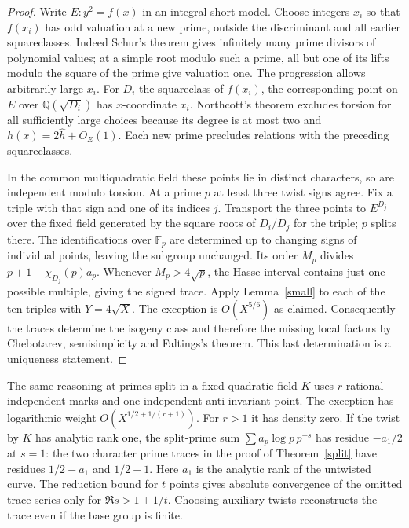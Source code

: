 \documentclass[11pt]{article}
\newcommand{\Q}{\mathbb Q}\newcommand{\Z}{\mathbb Z}\newcommand{\F}{\mathbb F}
\begin{document}
\begin{proof}
Write $E:y^2=f(x)$ in an integral short model. Choose integers $x_i$ so that $f(x_i)$ has odd valuation at a new prime, outside the discriminant and all earlier squareclasses. Indeed Schur's theorem gives infinitely many prime divisors of polynomial values; at a simple root modulo such a prime, all but one of its lifts modulo the square of the prime give valuation one. The progression allows arbitrarily large $x_i$. For $D_i$ the squareclass of $f(x_i)$, the corresponding point on $E$ over $\Q(\sqrt{D_i})$ has $x$-coordinate $x_i$. Northcott's theorem excludes torsion for all sufficiently large choices because its degree is at most two and $h(x)=2\hat h+O_E(1)$. Each new prime precludes relations with the preceding squareclasses.

In the common multiquadratic field these points lie in distinct characters, so are independent modulo torsion. At a prime $p$ at least three twist signs agree. Fix a triple with that sign and one of its indices $j$. Transport the three points to $E^{D_j}$ over the fixed field generated by the square roots of $D_i/D_j$ for the triple; $p$ splits there. The identifications over $\F_p$ are determined up to changing signs of individual points, leaving the subgroup unchanged. Its order $M_p$ divides $p+1-\chi_{D_j}(p)a_p$. Whenever $M_p>4\sqrt p$, the Hasse interval contains just one possible multiple, giving the signed trace. Apply Lemma~\ref{small} to each of the ten triples with $Y=4\sqrt X$. The exception is $O(X^{5/6})$ as claimed. Consequently the traces determine the isogeny class and therefore the missing local factors by Chebotarev, semisimplicity and Faltings's theorem. This last determination is a uniqueness statement.
\end{proof}
The same reasoning at primes split in a fixed quadratic field $K$ uses $r$ rational independent marks and one independent anti-invariant point. The exception has logarithmic weight $O(X^{1/2+1/(r+1)})$. For $r>1$ it has density zero. If the twist by $K$ has analytic rank one, the split-prime sum $\sum a_p\log p\,p^{-s}$ has residue $-a_1/2$ at $s=1$: the two character prime traces in the proof of Theorem~\ref{split} have residues $1/2-a_1$ and $1/2-1$. Here $a_1$ is the analytic rank of the untwisted curve. The reduction bound for $t$ points gives absolute convergence of the omitted trace series only for $\Re s>1+1/t$. Choosing auxiliary twists reconstructs the trace even if the base group is finite.
\end{document}
